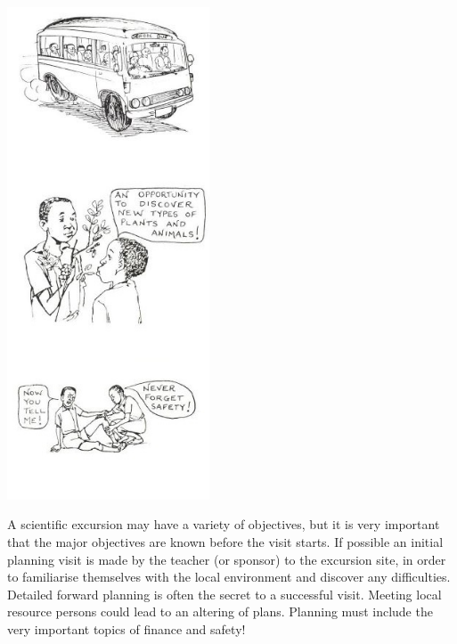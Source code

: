 \begin{multicols}{2}
\begin{center}
\includegraphics[width=0.45\textwidth]{./img/source/field-trips.jpg}
\end{center}

A scientific excursion may have a variety of
objectives, but it is very important that the major
objectives are known before the visit starts. If
possible an initial planning visit is made by the
teacher (or sponsor) to the excursion site, in
order to familiarise themselves with the local
environment and discover any difficulties.
Detailed forward planning is often the secret to
a successful visit. Meeting local resource persons
could lead to an altering of plans. Planning must
include the very important topics of finance and
safety!


\end{multicols}